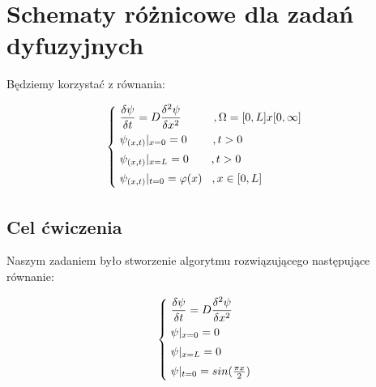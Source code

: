 \section{Schematy różnicowe dla zadań dyfuzyjnych}

Będziemy korzystać z równania:

\[
\begin{cases}
\vspace{0.1cm} 
\hspace{0,1cm} \dfrac{\delta \psi}{\delta t} = D\dfrac{\delta^2 \psi}{\delta x^2} \hspace{1cm}, \Omega = [0,L]x[0,\infty] \\
\vspace{0.1cm}
\hspace{0,1cm}\psi_{(x,t)}|_{x=0} = 0 \hspace{0.8cm},t>0 \\
\vspace{0.1cm} 
\hspace{0,1cm}\psi_{(x,t)}|_{x=L} = 0 \hspace{0.7cm},t>0 \\
\vspace{0.1cm} 
\hspace{0,1cm}\psi_{(x,t)}|_{t=0} = \varphi(x) \hspace{0.3cm},x\in[0,L]
\end{cases}
\]

\subsection{Cel ćwiczenia}

Naszym zadaniem było stworzenie algorytmu rozwiązującego następujące równanie:

\[
\begin{cases}
\vspace{0.1cm} 
\hspace{0,1cm} \dfrac{\delta \psi}{\delta t} = D\dfrac{\delta^2 \psi}{\delta x^2} \\
\vspace{0.1cm}
\hspace{0,1cm}\psi|_{x=0} = 0 \\
\vspace{0.1cm} 
\hspace{0,1cm}\psi|_{x=L} = 0 \\
\vspace{0.1cm} 
\hspace{0,1cm}\psi|_{t=0} = sin(\frac{\pi x}{2})
\end{cases}
\]

